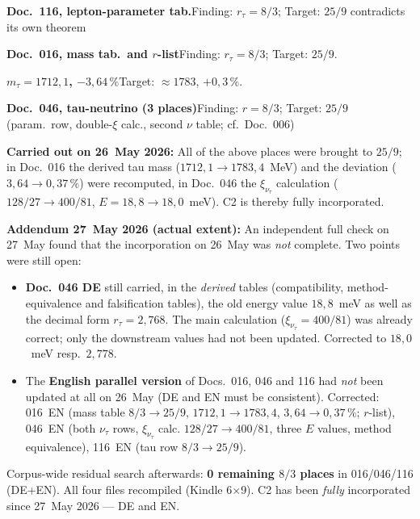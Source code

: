 \smallskip\noindent \textbf{Doc.~116, lepton-parameter tab.}\quad Finding: $r_\tau = 8/3$; Target: $25/9$ contradicts its own theorem

\smallskip\noindent \textbf{Doc.~016, mass tab.\ and $r$-list}\quad Finding: $r_\tau = 8/3$; Target: $25/9$.

\smallskip\noindent \textbf{$m_\tau = 1712{,}1$, $-3{,}64\,\%$}\quad Target: $\approx 1783$, $+0{,}3\,\%$.

\smallskip\noindent \textbf{Doc.~046, tau-neutrino (3 places)}\quad Finding: $r = 8/3$; Target: $25/9$ (param.\ row, double-$\xi$ calc., second $\nu$ table; cf.\ Doc.~006)

\medskip


\noindent\textbf{Carried out on 26~May 2026:} All of the above places were
brought to $25/9$; in Doc.~016 the derived tau mass ($1712{,}1 \to 1783{,}4$~MeV)
and the deviation ($3{,}64 \to 0{,}37\,\%$) were recomputed, in Doc.~046 the
$\xi_{\nu_\tau}$ calculation ($128/27 \to 400/81$, $E = 18{,}8 \to 18{,}0$~meV).
C2 is thereby fully incorporated.

\medskip
\noindent\textbf{Addendum 27~May 2026 (actual extent):} An independent full
check on 27~May found that the incorporation on 26~May was \emph{not} complete.
Two points were still open:
\begin{itemize}
  \item \textbf{Doc.~046 DE} still carried, in the \emph{derived} tables
        (compatibility, method-equivalence and falsification tables), the old
        energy value $18{,}8$~meV as well as the decimal form $r_\tau = 2{,}768$.
        The main calculation ($\xi_{\nu_\tau} = 400/81$) was already correct;
        only the downstream values had not been updated. Corrected to
        $18{,}0$~meV resp.\ $2{,}778$.
  \item The \textbf{English parallel version} of Docs.~016, 046 and 116 had
        \emph{not} been updated at all on 26~May (DE and EN must be
        consistent). Corrected: 016~EN (mass table $8/3 \to 25/9$,
        $1712{,}1 \to 1783{,}4$, $3{,}64 \to 0{,}37\,\%$; $r$-list),
        046~EN (both $\nu_\tau$ rows, $\xi_{\nu_\tau}$ calc.
        $128/27 \to 400/81$, three $E$ values, method equivalence),
        116~EN (tau row $8/3 \to 25/9$).
\end{itemize}
\noindent Corpus-wide residual search afterwards: \textbf{0 remaining $8/3$
places} in 016/046/116 (DE+EN). All four files recompiled (Kindle 6$\times$9).
C2 has been \emph{fully} incorporated since 27~May 2026 --- DE and EN.


